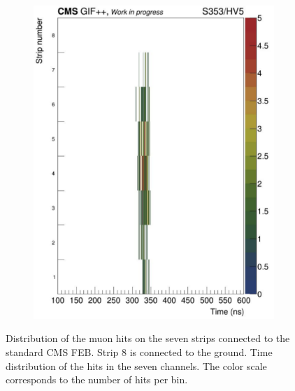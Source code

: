 \begin{figure}[H]
\begin{subfigure}{0.5\linewidth}
			\includegraphics[width = .8\linewidth]{fig/chapt6/iRPC-CMS_FEB-TimeProfile.png}
			\caption{\label{fig:iRPC_CMS_Profiles:B}}
		\end{subfigure}
		\caption{\label{fig:iRPC_CMS_Profiles}  Distribution of the muon hits on the seven strips connected to the standard CMS FEB. Strip 8 is connected to the ground.  Time distribution of the hits in the seven channels. The color scale corresponds to the number of hits per bin.}
    \end{figure}
	 
